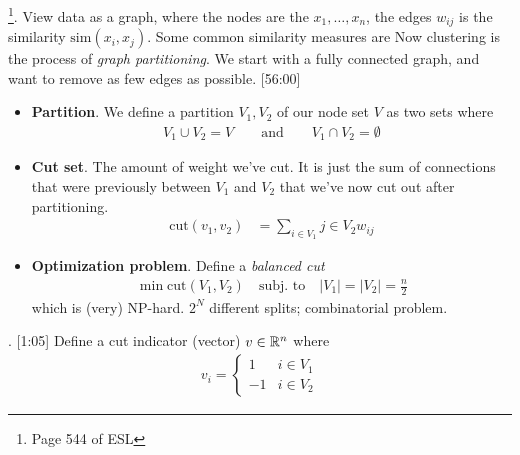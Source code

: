 \documentclass[12pt]{article}
\newcommand{\myspace}{\vspace{2\bigskipamount}}
\newcommand\p{\Needspace{10\baselineskip} \noindent}
\begin{document}
\myspace
\p {}\footnote{Page 544 of ESL}. View data as a graph, where the nodes are the $x_1, \ldots, x_n$, the edges $w_{ij}$ is the similarity $\text{sim}(x_i, x_j)$. Some common similarity measures are
Now clustering is the process of \textit{graph partitioning}. We start with a fully connected graph, and want to remove as few edges as possible. [56:00]
\begin{itemize}
	
	\item \textbf{Partition}. We define a partition $V_1, V_2$ of our node set $V$ as two sets where
	\begin{align}
		V_1 \cup V_2 = V \qquad \text{and} \qquad V_1 \cap V_2 = \emptyset
	\end{align}
	

	
	
	\item \textbf{Cut set}. The amount of weight we've cut. It is just the sum of connections that were previously between $V_1$ and $V_2$ that we've now cut out after partitioning.
	\begin{align}
		\text{cut}(v_1, v_2) &= \sum_{i \in V_1}{j \in V_2} w_{ij}
	\end{align}
	
	\item \textbf{Optimization problem}. Define a \textit{balanced cut}
	\begin{align}
		\min \text{cut}(V_1, V_2) \quad \text{subj. to} \quad |V_1| = |V_2| = \frac{n}{2}
	\end{align}
	which is (very) NP-hard. $2^N$ different splits; combinatorial problem.
\end{itemize}


\myspace
\p {}. [1:05] Define a cut indicator (vector) $v \in \mathbb{R}^n$ where 
\begin{align}
	v_i = \begin{cases}1 & i \in V_1 \\ -1 & i \in V_2 \end{cases}
\end{align}
\end{document}
